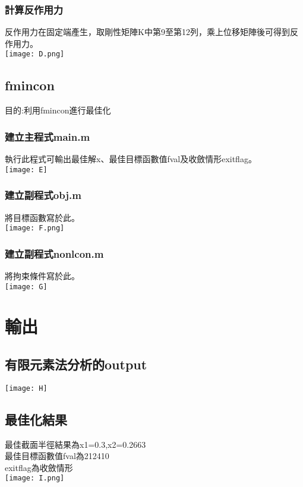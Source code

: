 \documentclass{article}
\begin{document}
        \subsubsection{計算反作用力}反作用力在固定端產生，取剛性矩陣K中第9至第12列，乘上位移矩陣後可得到反作用力。\\\texttt{[image: D.png]}

    \subsection{fmincon}
        目的:利用fmincon進行最佳化
        \subsubsection{建立主程式main.m}
            執行此程式可輸出最佳解x、最佳目標函數值fval及收斂情形exitflag。\\\texttt{[image: E]}
        \subsubsection{建立副程式obj.m}
            將目標函數寫於此。\\\texttt{[image: F.png]}
        \subsubsection{建立副程式nonlcon.m}
            將拘束條件寫於此。\\\texttt{[image: G]}

    \section{輸出}
	\subsection{有限元素法分析的output}
	\texttt{[image: H]}\\
	\subsection{最佳化結果}
	最佳截面半徑結果為x1=0.3,x2=0.2663\\
	最佳目標函數值fval為212410\\
	exitflag為收斂情形\\
	\texttt{[image: I.png]}
 
\end{document}
